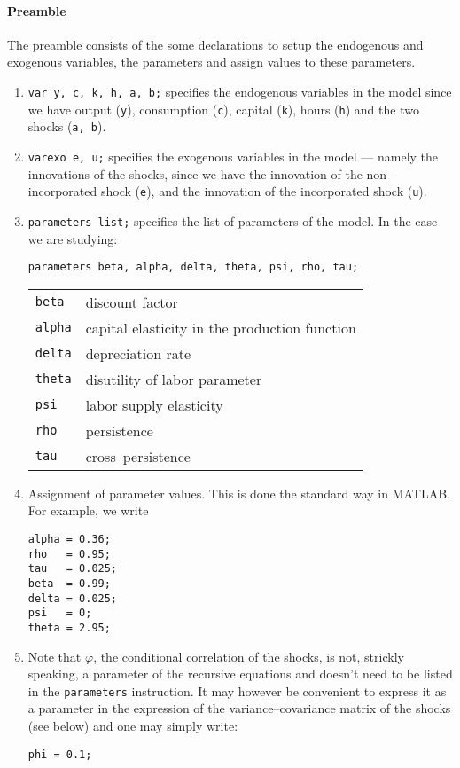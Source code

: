 \documentclass[11pt,a4paper]{article}
\begin{document}
\paragraph{Preamble}
The preamble consists of the some declarations to setup the endogenous and exogenous variables, the parameters and assign values to these parameters.
\begin{enumerate}
\item {\tt var y, c, k, h, a, b;} specifies the endogenous variables in the model since we have output ({\tt y}), consumption ({\tt c}), capital ({\tt k}), hours ({\tt h}) and the two shocks ({\tt a, b}).
\item {\tt varexo e, u;} specifies the exogenous variables in the model --- namely the innovations of the shocks, since we have the innovation of the non--incorporated shock ({\tt e}), and the innovation of the incorporated shock ({\tt u}).
\item {\tt parameters list;} specifies the list of parameters of the model. In the case we are studying:

{\tt parameters beta, alpha, delta, theta, psi, rho, tau;}

\begin{tabular}{ll}
\hline
\hline
{\tt beta}  & discount factor                               \\
{\tt alpha} & capital elasticity in the production function \\
{\tt delta} & depreciation rate                             \\
{\tt theta} & disutility of labor parameter                 \\
{\tt psi}   & labor supply elasticity                       \\
{\tt rho}   & persistence                                   \\
{\tt tau}   & cross--persistence                            \\
\hline
\hline
\end{tabular}
\item Assignment of parameter values. This is done the standard way in MATLAB. For example, we write

\begin{verbatim}
alpha = 0.36;
rho   = 0.95;
tau   = 0.025;
beta  = 0.99;
delta = 0.025;
psi   = 0;
theta = 2.95;
\end{verbatim}


\item Note that $\varphi$, the conditional correlation of the shocks, is not, strickly speaking, a parameter of the recursive equations and doesn't need to be listed in the {\tt parameters} instruction. It may however be convenient to express it as a parameter in the expression of the variance--covariance matrix of the shocks (see below) and one may simply write:

{\tt phi = 0.1; }

\end{enumerate}
\end{document}
